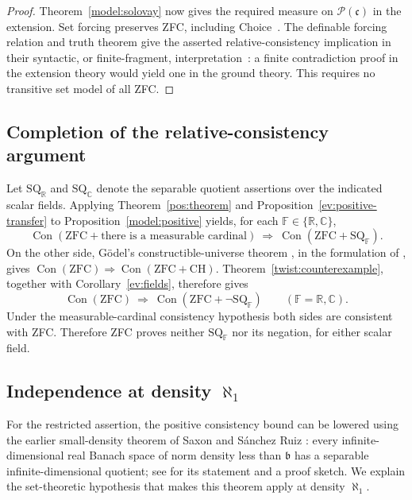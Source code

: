 \begin{proof}
Theorem~\ref{model:solovay} now gives the required measure on
$\mathcal P(\mathfrak c)$ in the extension.  Set forcing preserves ZFC,
including Choice~\cite[Chapter~VII, Theorem~4.2]{Kunen1980}.
The definable forcing relation and truth theorem
\cite[Chapter~VII, Theorems~3.5--3.6]{Kunen1980} give the asserted
relative-consistency implication in their syntactic, or finite-fragment,
interpretation~\cite[Chapter~VII, Sections~1 and~9]{Kunen1980}:
a finite contradiction proof in the extension theory would yield one in
the ground theory. This requires no transitive set model of all ZFC.
\end{proof}

\subsection*{Completion of the relative-consistency argument}
Let $\mathrm{SQ}_{\mathbb R}$ and $\mathrm{SQ}_{\mathbb C}$ denote the
separable quotient assertions over the indicated scalar fields.
Applying Theorem~\ref{pos:theorem} and Proposition~\ref{ev:positive-transfer} to
Proposition~\ref{model:positive} yields, for each
$\mathbb F\in\{\mathbb R,\mathbb C\}$,
\[
 \operatorname{Con}(\mathrm{ZFC}+\text{there is a measurable cardinal})
 \ \Longrightarrow\
 \operatorname{Con}(\mathrm{ZFC}+\mathrm{SQ}_{\mathbb F}).
\]
On the other side, G\"odel's constructible-universe theorem
\cite{Godel1938}, in the formulation of
\cite[Chapter~VI, Corollary~4.9]{Kunen1980}, gives
$\operatorname{Con}(\mathrm{ZFC})\Longrightarrow
\operatorname{Con}(\mathrm{ZFC}+\mathrm{CH})$.
Theorem~\ref{twist:counterexample}, together with Corollary~\ref{ev:fields},
therefore gives
\[
 \operatorname{Con}(\mathrm{ZFC})
 \ \Longrightarrow\
 \operatorname{Con}(\mathrm{ZFC}+\neg\mathrm{SQ}_{\mathbb F})
 \qquad(\mathbb F=\mathbb R,\mathbb C).
\]
Under the measurable-cardinal consistency hypothesis both sides are
consistent with ZFC.  Therefore ZFC proves neither
$\mathrm{SQ}_{\mathbb F}$ nor its negation, for either scalar field.

\subsection{Independence at density $\aleph_1$}

For the restricted assertion, the positive consistency bound can be
lowered using the earlier small-density theorem of Saxon and
S\'anchez Ruiz \cite{SaxonSanchezRuiz1996}: every infinite-dimensional
real Banach space of norm density less than $\mathfrak b$ has a separable
infinite-dimensional quotient; see \cite[Theorem~2.1]{Brech2025} for
its statement and a proof sketch. We explain the set-theoretic hypothesis that
makes this theorem apply at density $\aleph_1$.

